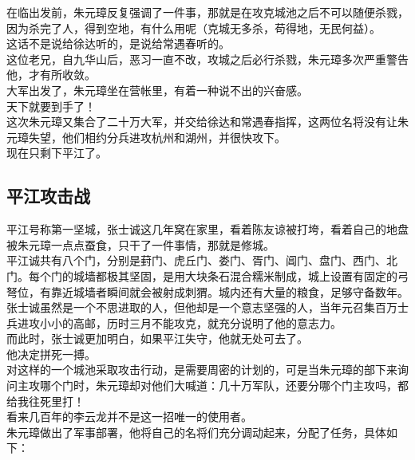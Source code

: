 \begin{multicols}{\theparacolNo}
在临出发前，朱元璋反复强调了一件事，那就是在攻克城池之后不可以随便杀戮，因为杀完了人，得到空地，有什么用呢（克城无多杀，苟得地，无民何益）。\\

这话不是说给徐达听的，是说给常遇春听的。\\

这位老兄，自九华山后，恶习一直不改，攻城之后必行杀戮，朱元璋多次严重警告他，才有所收敛。\\

大军出发了，朱元璋坐在营帐里，有着一种说不出的兴奋感。\\

天下就要到手了！\\

这次朱元璋又集合了二十万大军，并交给徐达和常遇春指挥，这两位名将没有让朱元璋失望，他们相约分兵进攻杭州和湖州，并很快攻下。\\

现在只剩下平江了。\\

\subsection{平江攻击战}
平江号称第一坚城，张士诚这几年窝在家里，看着陈友谅被打垮，看着自己的地盘被朱元璋一点点蚕食，只干了一件事情，那就是修城。\\

平江诚共有八个门，分别是葑门、虎丘门、娄门、胥门、阊门、盘门、西门、北门。每个门的城墙都极其坚固，是用大块条石混合糯米制成，城上设置有固定的弓弩位，有靠近城墙者瞬间就会被射成刺猬。城内还有大量的粮食，足够守备数年。\\

张士诚虽然是一个不思进取的人，但他却是一个意志坚强的人，当年元召集百万士兵进攻小小的高邮，历时三月不能攻克，就充分说明了他的意志力。\\

而此时，张士诚更加明白，如果平江失守，他就无处可去了。\\

他决定拼死一搏。\\

对这样的一个城池采取攻击行动，是需要周密的计划的，可是当朱元璋的部下来询问主攻哪个门时，朱元璋却对他们大喊道：几十万军队，还要分哪个门主攻吗，都给我往死里打！\\

看来几百年的李云龙并不是这一招唯一的使用者。\\

朱元璋做出了军事部署，他将自己的名将们充分调动起来，分配了任务，具体如下：\\


\end{multicols}
